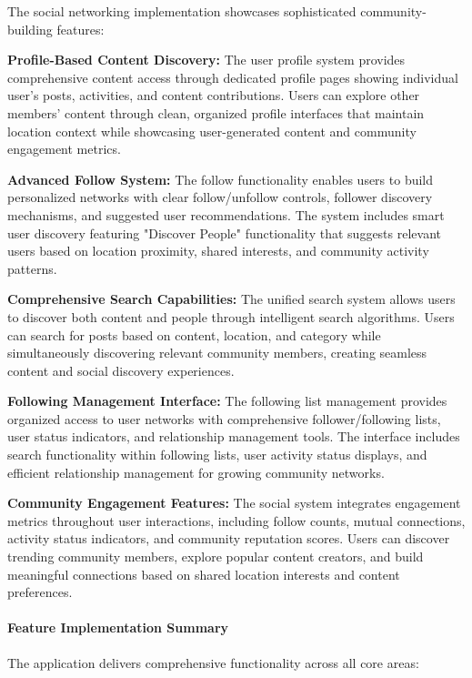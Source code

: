 The social networking implementation showcases sophisticated community-building features:

\textbf{Profile-Based Content Discovery:}
The user profile system provides comprehensive content access through dedicated profile pages showing individual user's posts, activities, and content contributions. Users can explore other members' content through clean, organized profile interfaces that maintain location context while showcasing user-generated content and community engagement metrics.

\textbf{Advanced Follow System:}
The follow functionality enables users to build personalized networks with clear follow/unfollow controls, follower discovery mechanisms, and suggested user recommendations. The system includes smart user discovery featuring "Discover People" functionality that suggests relevant users based on location proximity, shared interests, and community activity patterns.

\textbf{Comprehensive Search Capabilities:}
The unified search system allows users to discover both content and people through intelligent search algorithms. Users can search for posts based on content, location, and category while simultaneously discovering relevant community members, creating seamless content and social discovery experiences.

\textbf{Following Management Interface:}
The following list management provides organized access to user networks with comprehensive follower/following lists, user status indicators, and relationship management tools. The interface includes search functionality within following lists, user activity status displays, and efficient relationship management for growing community networks.

\textbf{Community Engagement Features:}
The social system integrates engagement metrics throughout user interactions, including follow counts, mutual connections, activity status indicators, and community reputation scores. Users can discover trending community members, explore popular content creators, and build meaningful connections based on shared location interests and content preferences.

\paragraph{Feature Implementation Summary}
The application delivers comprehensive functionality across all core areas:

